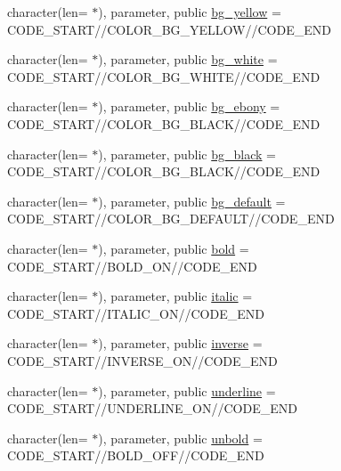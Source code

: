 \begin{DoxyCompactItemize}
\item 
character(len= $\ast$), parameter, public \mbox{\hyperlink{namespacem__escape_afe23b71a7646ac88c8c74358994f92d0}{bg\+\_\+yellow}} = C\+O\+D\+E\+\_\+\+S\+T\+A\+RT//C\+O\+L\+O\+R\+\_\+\+B\+G\+\_\+\+Y\+E\+L\+L\+OW//C\+O\+D\+E\+\_\+\+E\+ND
\item 
character(len= $\ast$), parameter, public \mbox{\hyperlink{namespacem__escape_a87dfd88e3190a8717cc574d4f2a4445c}{bg\+\_\+white}} = C\+O\+D\+E\+\_\+\+S\+T\+A\+RT//C\+O\+L\+O\+R\+\_\+\+B\+G\+\_\+\+W\+H\+I\+TE//C\+O\+D\+E\+\_\+\+E\+ND
\item 
character(len= $\ast$), parameter, public \mbox{\hyperlink{namespacem__escape_ab3691cc02cfaf12d6f7e18fac8a70b0b}{bg\+\_\+ebony}} = C\+O\+D\+E\+\_\+\+S\+T\+A\+RT//C\+O\+L\+O\+R\+\_\+\+B\+G\+\_\+\+B\+L\+A\+CK//C\+O\+D\+E\+\_\+\+E\+ND
\item 
character(len= $\ast$), parameter, public \mbox{\hyperlink{namespacem__escape_a2f34e53ba01ebac10ab70f25e3c9727a}{bg\+\_\+black}} = C\+O\+D\+E\+\_\+\+S\+T\+A\+RT//C\+O\+L\+O\+R\+\_\+\+B\+G\+\_\+\+B\+L\+A\+CK//C\+O\+D\+E\+\_\+\+E\+ND
\item 
character(len= $\ast$), parameter, public \mbox{\hyperlink{namespacem__escape_a329b88dbfe4ad42f896cdf408dcd9784}{bg\+\_\+default}} = C\+O\+D\+E\+\_\+\+S\+T\+A\+RT//C\+O\+L\+O\+R\+\_\+\+B\+G\+\_\+\+D\+E\+F\+A\+U\+LT//C\+O\+D\+E\+\_\+\+E\+ND
\item 
character(len= $\ast$), parameter, public \mbox{\hyperlink{namespacem__escape_a9a369de1d051ce7fdbdedcba4574c962}{bold}} = C\+O\+D\+E\+\_\+\+S\+T\+A\+RT//B\+O\+L\+D\+\_\+\+ON//C\+O\+D\+E\+\_\+\+E\+ND
\item 
character(len= $\ast$), parameter, public \mbox{\hyperlink{namespacem__escape_afbb060c43fe019ca7fc699073cf30399}{italic}} = C\+O\+D\+E\+\_\+\+S\+T\+A\+RT//I\+T\+A\+L\+I\+C\+\_\+\+ON//C\+O\+D\+E\+\_\+\+E\+ND
\item 
character(len= $\ast$), parameter, public \mbox{\hyperlink{namespacem__escape_a568054a95202a9290fc4f314ff7c9012}{inverse}} = C\+O\+D\+E\+\_\+\+S\+T\+A\+RT//I\+N\+V\+E\+R\+S\+E\+\_\+\+ON//C\+O\+D\+E\+\_\+\+E\+ND
\item 
character(len= $\ast$), parameter, public \mbox{\hyperlink{namespacem__escape_acee3a3082a12ed884ef99019d0f30f86}{underline}} = C\+O\+D\+E\+\_\+\+S\+T\+A\+RT//U\+N\+D\+E\+R\+L\+I\+N\+E\+\_\+\+ON//C\+O\+D\+E\+\_\+\+E\+ND
\item 
character(len= $\ast$), parameter, public \mbox{\hyperlink{namespacem__escape_aaa2404c29a0f5840417e71a8219a118c}{unbold}} = C\+O\+D\+E\+\_\+\+S\+T\+A\+RT//B\+O\+L\+D\+\_\+\+O\+FF//C\+O\+D\+E\+\_\+\+E\+ND

\end{DoxyCompactItemize}
